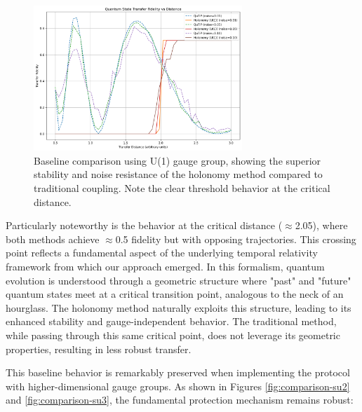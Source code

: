 \documentclass[12pt]{article}
\begin{document}
\begin{figure}[h!]
\centering
\includegraphics[width=0.7\textwidth]{transfer_comparison-u1.png}
\caption{Baseline comparison using U(1) gauge group, showing the superior stability and noise resistance of the holonomy method compared to traditional coupling. Note the clear threshold behavior at the critical distance.}
\label{fig:comparison-u1}
\end{figure}

Particularly noteworthy is the behavior at the critical distance ($\approx$2.05), where both methods achieve $\approx$0.5 fidelity but with opposing trajectories. This crossing point reflects a fundamental aspect of the underlying temporal relativity framework from which our approach emerged. In this formalism, quantum evolution is understood through a geometric structure where "past" and "future" quantum states meet at a critical transition point, analogous to the neck of an hourglass. The holonomy method naturally exploits this structure, leading to its enhanced stability and gauge-independent behavior. The traditional method, while passing through this same critical point, does not leverage its geometric properties, resulting in less robust transfer.

This baseline behavior is remarkably preserved when implementing the protocol with higher-dimensional gauge groups. As shown in Figures \ref{fig:comparison-su2} and \ref{fig:comparison-su3}, the fundamental protection mechanism remains robust:
\end{document}

